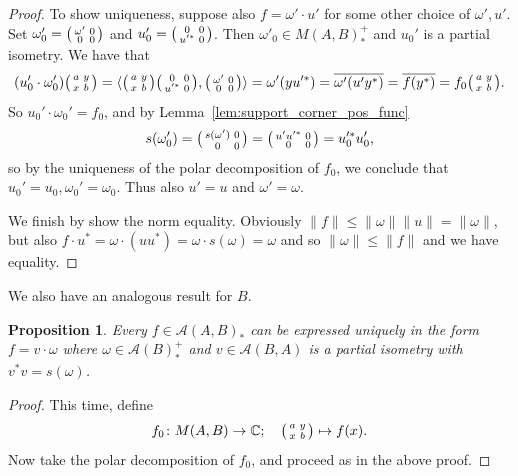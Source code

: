\documentclass[a4paper,11pt]{article}
\theoremstyle{plain}
\newtheorem{proposition}{Proposition}[section]
\theoremstyle{remark}
\newcommand{\mc}[1]{\mathcal{#1}}
\newcommand{\ip}[2]{{\langle {#1} , {#2} \rangle}}
\newenvironment{smat}{\bigl(\begin{smallmatrix}}{\end{smallmatrix}\bigr)}
\begin{document}
\begin{proof}
To show uniqueness, suppose also $f = \omega'\cdot u'$ for some other choice of $\omega', u'$.  Set $\omega_0' = \begin{smat} \omega' & 0 \\ 0 & 0 \end{smat}$ and $u_0' = \begin{smat} 0 & 0 \\ u'^* & 0 \end{smat}$.  Then $\omega'_0 \in M(A,B)_*^+$ and $u_0'$ is a partial isometry.  We have that
\[ (u_0'\cdot\omega_0') \begin{smat} a & y \\ x & b \end{smat}
= \ip{ \begin{smat} a & y \\ x & b \end{smat} \begin{smat} 0 & 0 \\ u'^* & 0 \end{smat} }{ \begin{smat} \omega' & 0 \\ 0 & 0 \end{smat} }
= \omega'(yu'^*)
= \overline{ \omega'(u'y^*) }
= \overline{ f(y^*) }
= f_0 \begin{smat} a & y \\ x & b \end{smat}. \]
So $u_0' \cdot \omega_0' = f_0$, and by Lemma~\ref{lem:support_corner_pos_func}
\[ s(\omega_0') = \begin{smat} s(\omega') & 0 \\ 0 & 0 \end{smat}
= \begin{smat} u'u'^* & 0 \\ 0 & 0 \end{smat}
= u_0'^* u_0', \]
so by the uniqueness of the polar decomposition of $f_0$, we conclude that $u_0' = u_0, \omega_0' = \omega_0$.  Thus also $u' = u$ and $\omega' = \omega$.

We finish by show the norm equality.  Obviously $\|f\| \leq \|\omega\| \|u\| = \|\omega\|$, but also $f \cdot u^* = \omega \cdot (uu^*) = \omega \cdot s(\omega) = \omega$ and so $\|\omega\| \leq \|f\|$ and we have equality.
\end{proof}

We also have an analogous result for $B$.

\begin{proposition}\label{prop:pd_funcs_other}
Every $f \in \mc A(A,B)_*$ can be expressed uniquely in the form $f = v \cdot \omega$ where $\omega\in\mc A(B)_*^+$ and $v\in \mc A(B,A)$ is a partial isometry with $v^*v = s(\omega)$.
\end{proposition}
\begin{proof}
This time, define
\[ f_0 \colon M(A,B) \to \mathbb C; \quad \begin{smat} a & y \\ x & b \end{smat} \mapsto f(x). \]
Now take the polar decomposition of $f_0$, and proceed as in the above proof.
\end{proof}
\end{document}
